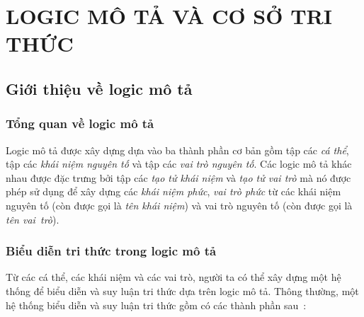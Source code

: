 \chapter[Logic mô tả và cơ sở tri thức]{LOGIC MÔ TẢ VÀ CƠ SỞ TRI THỨC}
\label{Chapter1}
\thispagestyle{fancy}

\section{Giới thiệu về logic mô tả}
\label{sec:Chap1.Introduction}
\subsection{Tổng quan về logic mô tả}
\label{sec:Chap1.Overview}

Logic mô tả được xây dựng dựa vào ba thành phần cơ bản gồm tập các {\em cá thể}, tập các {\em khái niệm nguyên tố} và tập các {\em vai trò nguyên tố}.
%
Các logic mô tả khác nhau được đặc trưng bởi tập các {\em tạo tử khái niệm} và {\em tạo tử vai trò} mà nó được phép sử dụng để xây dựng các {\em khái niệm phức}, {\em vai trò phức} từ các khái niệm nguyên tố (còn được gọi là {\em tên khái niệm}) và vai trò nguyên tố (còn được gọi là {\em tên vai~trò}).

\subsection{Biểu diễn tri thức trong logic mô tả}
\label{sec:Chap1.KnowledgeRepresentation}

Từ các cá thể, các khái niệm và các vai trò, người ta có thể xây dựng một hệ thống để biểu diễn và suy luận tri thức dựa trên logic mô tả. Thông thường, một hệ thống biểu diễn và suy luận tri thức gồm có các thành phần sau~\cite{DLHandbook2007}:

